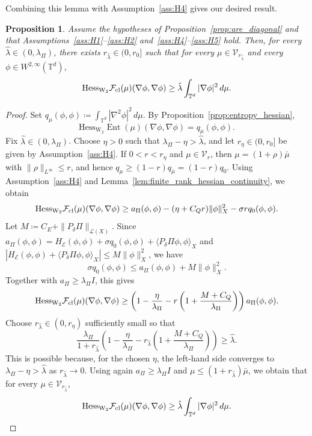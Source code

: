 \documentclass[11pt]{article}
\numberwithin{equation}{section}
\newtheorem{proposition}[theorem]{Proposition}
\theoremstyle{definition}
\newcommand{\T}{\mathbb{T}}
\newcommand{\F}{\mathcal{F}}
\newcommand{\E}{\mathcal{E}}
\newcommand{\Wtwo}{\operatorname{W}_2}
\newcommand{\Ent}{\operatorname{Ent}}
\begin{document}
Combining this lemma with Assumption~\ref{ass:H4} gives our desired result.

\begin{proposition}
\label{prop:persistence_hessian_lower_bound}
    Assume the hypotheses of Proposition~\ref{prop:are_diagonal} and that Assumptions~\ref{ass:H1}--\ref{ass:H2} and~\ref{ass:H4}--\ref{ass:H5} hold.
    Then, for every $\hat{\lambda} \in (0, \lambda_\Pi)$, there exists $r_{\hat{\lambda}} \in (0, r_0]$ such that for every $\mu \in \mathcal{V}_{r_{\hat{\lambda}}}$ and every $\phi \in W^{2,\infty}(\T^d)$,
    \[
    \mathrm{Hess}_{\Wtwo} \F_{\rm cl}(\mu)(\nabla\phi,\nabla\phi) \ge \hat{\lambda} \int_{\T^d} |\nabla\phi|^2\,d\mu.
    \]
\end{proposition}

\begin{proof}
    Set $q_\mu(\phi,\phi) \coloneqq \int_{\T^d}|\nabla^2\phi|^2 \, d\mu$.
    By Proposition~\ref{prop:entropy_hessian},
    \[
    \mathrm{Hess}_{\Wtwo} \Ent(\mu)(\nabla\phi, \nabla\phi) = q_\mu(\phi,\phi).
    \]
    Fix $\hat{\lambda} \in (0,\lambda_\Pi)$. 
    Choose $\eta > 0$ such that $\lambda_\Pi - \eta > \hat{\lambda}$, and let $r_\eta \in (0,r_0]$ be given by Assumption~\ref{ass:H4}.
    If $0 < r < r_\eta$ and $\mu \in \mathcal{V}_r$, then $\mu = (1+\rho)\bar\mu$ with $\|\rho\|_{L^\infty} \le r$, and hence $q_\mu \ge (1-r) q_{\bar\mu} = (1-r)q_0$.
    Using Assumption~\ref{ass:H4} and Lemma~\ref{lem:finite_rank_hessian_continuity}, we obtain
    \[
    \mathrm{Hess}_{\Wtwo} \F_{\rm cl}(\mu)(\nabla\phi,\nabla\phi) \ge a_\Pi(\phi,\phi) - (\eta + C_Q r)\|\phi\|_X^2 - \sigma r q_0(\phi,\phi).
    \]
    Let $M \coloneqq C_E + \|P_\delta\Pi\|_{\mathcal{L}(X)}$.
    Since $a_\Pi(\phi,\phi) = H_\E(\phi,\phi) + \sigma q_0(\phi,\phi) + \langle P_\delta\Pi \phi, \phi\rangle_X$ and $|H_\E(\phi,\phi) + \langle P_\delta\Pi\phi,\phi\rangle_X| \le M\|\phi\|_X^2$, we have
    \[
    \sigma q_0(\phi,\phi) \le a_\Pi(\phi,\phi) + M\|\phi\|_X^2.
    \]
    Together with $a_\Pi \ge \lambda_\Pi I$, this gives
    \[
    \mathrm{Hess}_{\Wtwo}\F_{\rm cl}(\mu)(\nabla\phi,\nabla\phi) \ge \left(1 - \frac{\eta}{\lambda_\Pi} - r\left(1 + \frac{M + C_Q}{\lambda_\Pi}\right)\right) a_\Pi(\phi,\phi).
    \]
    Choose $r_{\hat{\lambda}} \in (0,r_\eta)$ sufficiently small so that
    \[
    \frac{\lambda_\Pi}{1 + r_{\hat{\lambda}}} \left(1 - \frac{\eta}{\lambda_\Pi} - r_{\hat{\lambda}} \left(1 + \frac{M + C_Q}{\lambda_\Pi}\right)\right) \ge \hat{\lambda}.
    \]
    This is possible because, for the chosen $\eta$, the left-hand side converges to $\lambda_\Pi - \eta > \hat{\lambda}$ as $r_{\hat{\lambda}} \to 0$.
    Using again $a_\Pi\ge\lambda_\Pi I$ and $\mu \le (1 + r_{\hat{\lambda}})\bar\mu$, we obtain that for every $\mu \in \mathcal{V}_{r_{\hat{\lambda}}}$,
    \[
    \mathrm{Hess}_{\Wtwo}\F_{\rm cl}(\mu)(\nabla\phi,\nabla\phi) \ge \hat{\lambda} \int_{\T^d} |\nabla\phi|^2\,d\mu. \qedhere
    \]
\end{proof}
\end{document}
